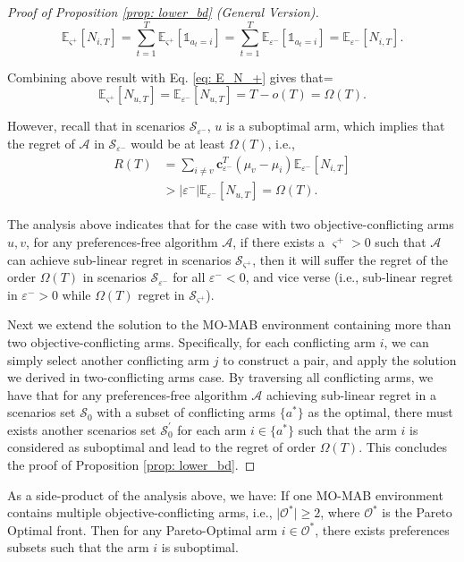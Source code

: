 \begin{proof}[Proof of Proposition \ref{prop: lower_bd} (General Version)]
\[
\mathbb{E}_{\varsigma^{+}}[ N_{i,T} ]
=
\sum_{t=1}^{T} \mathbb{E}_{\varsigma^{+}}[ \mathds{1}_{a_t = i} ]
=
\sum_{t=1}^{T} \mathbb{E}_{\varepsilon^{-}}[ \mathds{1}_{a_t = i} ]
=
\mathbb{E}_{\varepsilon^{-}}[ N_{i,T} ].
\]

Combining above result with Eq. \ref{eq: E_N_+} gives that= 
\[
\mathbb{E}_{\varsigma^{+}}[N_{u,T}] = \mathbb{E}_{\varepsilon^{-}}[N_{u,T}] = T - o(T) = \Omega(T).
\]

However, recall that in scenarios $\mathcal{S}_{\varepsilon^{-}}$, $u$ is a suboptimal arm, which implies that the regret of $\mathcal{A}$ in $\mathcal{S}_{\varepsilon^{-}}$ would be at least $\Omega(T)$, i.e.,
\[
\begin{aligned}
R(T) 
& = 
\sum_{i \neq v} \boldsymbol{c}_{\varepsilon^{-}}^T (\mu_{v} - \mu_{i}) \mathbb{E}_{\varepsilon^{-}}[ N_{i,T}] \\
& >
|\varepsilon^{-}| \mathbb{E}_{\varepsilon^{-}}[ N_{u,T}]
=
\Omega(T).
\end{aligned}
\]

The analysis above indicates that for the case with two objective-conflicting arms $u, v$, for any preferences-free algorithm $\mathcal{A}$, if there exists a $ \varsigma^{+}>0$ such that $\mathcal{A}$ can achieve sub-linear regret in scenarios $\mathcal{S}_{\varsigma^{+}}$, then it will suffer the regret of the order $\Omega(T)$ in scenarios $\mathcal{S}_{\varepsilon^{-}}$ for all $\varepsilon^{-}<0$, and vice verse (i.e., sub-linear regret in $\varepsilon^{-}>0$ while $\Omega(T)$ regret in $\mathcal{S}_{\varsigma^{+}}$).

Next we extend the solution to the MO-MAB environment containing more than two objective-conflicting arms.
Specifically, for each conflicting arm $i$, we can simply select another conflicting arm $j$ to construct a pair, and apply the solution we derived in two-conflicting arms case. 
By traversing all conflicting arms, we have that for any preferences-free algorithm $\mathcal{A}$ achieving sub-linear regret in a scenarios set $\mathcal{S}_{0}$ with a subset of conflicting arms $\{a^*\}$ as the optimal, there must exists another scenarios set $\mathcal{S}^{\prime}_0$ for each arm $i \in \{a^*\}$ such that the arm $i$ is considered as suboptimal and lead to the regret of order $\Omega(T)$.
This concludes the proof of Proposition \ref{prop: lower_bd}.
\end{proof}


\begin{remark}
\label{remark:lower_bd}
As a side-product of the analysis above, we have:
If one MO-MAB environment contains multiple objective-conflicting arms, i.e., $\vert \mathcal{O}^{*} \vert \geq 2$, where $\mathcal{O}^{*}$ is the Pareto Optimal front. 
Then for any Pareto-Optimal arm $i \in \mathcal{O}^{*}$, there exists preferences subsets such that the arm $i$ is suboptimal.
\end{remark}    


